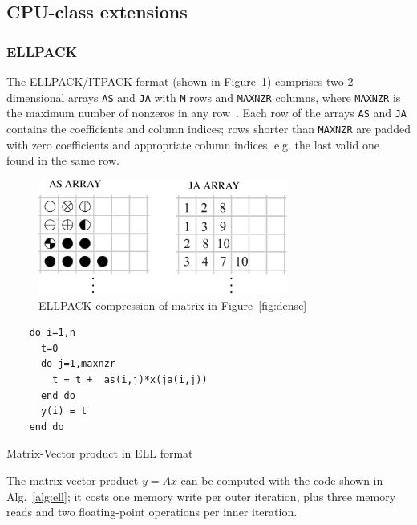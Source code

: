 \subsection{CPU-class extensions}


\subsubsection*{ELLPACK}

The ELLPACK/ITPACK format (shown in Figure~\ref{fig:ell}) 
comprises  two 2-dimensional arrays \verb|AS| and
\verb|JA|  with \verb|M| rows and \verb|MAXNZR| columns, where
\verb|MAXNZR| is the maximum
number of nonzeros in any row~\cite{ELLPACK}. 
Each row of the arrays \verb|AS| and \verb|JA| contains the
coefficients and column indices; rows shorter than
\verb|MAXNZR| are padded with zero coefficients and appropriate column
indices, e.g. the last valid one found in the same row.

\begin{figure}[ht]
	\centering
		\includegraphics[width=8.2cm]{figures/ell.pdf}
	\caption{ELLPACK compression of matrix in Figure~\ref{fig:dense}}
	\label{fig:ell}
\end{figure} 


\begin{algorithm}
\lstset{language=Fortran}
\small
  \begin{lstlisting}
    do i=1,n
      t=0
      do j=1,maxnzr
        t = t +  as(i,j)*x(ja(i,j))
      end do
      y(i) = t
    end do
  \end{lstlisting}
  \caption{\label{alg:ell} Matrix-Vector product in ELL format}
\end{algorithm}
The matrix-vector product $y=Ax$ can be computed with the code shown in
Alg.~\ref{alg:ell}; it costs  one  memory write per outer iteration, 
plus three memory reads  and two floating-point operations per inner
iteration.   


